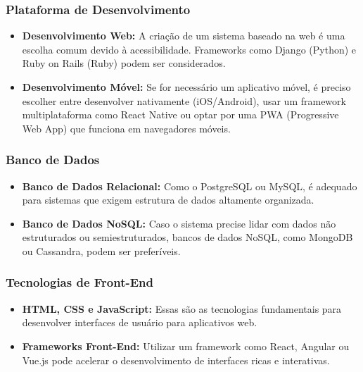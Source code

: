        \subsubsection{Plataforma de Desenvolvimento}
       
       \begin{itemize}
       	\item \textbf{Desenvolvimento Web:} A criação de um sistema baseado na web é uma escolha comum devido à acessibilidade. Frameworks como Django (Python) e Ruby on Rails (Ruby) podem ser considerados.
       	\item \textbf{Desenvolvimento Móvel:} Se for necessário um aplicativo móvel, é preciso escolher entre desenvolver nativamente (iOS/Android), usar um framework multiplataforma como React Native ou optar por uma PWA (Progressive Web App) que funciona em navegadores móveis.
       \end{itemize}
       
       \subsubsection{Banco de Dados}
       
       \begin{itemize}
       	\item \textbf{Banco de Dados Relacional:} Como o PostgreSQL ou MySQL, é adequado para sistemas que exigem estrutura de dados altamente organizada.
       	\item \textbf{Banco de Dados NoSQL:} Caso o sistema precise lidar com dados não estruturados ou semiestruturados, bancos de dados NoSQL, como MongoDB ou Cassandra, podem ser preferíveis.
       \end{itemize}
       
       \subsubsection{Tecnologias de Front-End}
       
       \begin{itemize}
       	\item \textbf{HTML, CSS e JavaScript:} Essas são as tecnologias fundamentais para desenvolver interfaces de usuário para aplicativos web.
       	\item \textbf{Frameworks Front-End:} Utilizar um framework como React, Angular ou Vue.js pode acelerar o desenvolvimento de interfaces ricas e interativas.
       \end{itemize}
       
